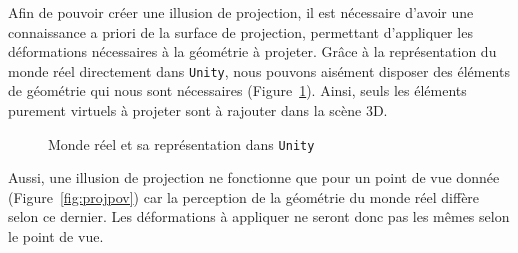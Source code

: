 Afin de pouvoir créer une illusion de projection, il est nécessaire d'avoir une connaissance a priori de la surface de projection, permettant d'appliquer les déformations nécessaires à la géométrie à projeter. Grâce à la représentation du monde réel directement dans \texttt{Unity}, nous pouvons aisément disposer des éléments de géométrie qui nous sont nécessaires (Figure~\ref{fig:realvsunity}). Ainsi, seuls les éléments purement virtuels à projeter sont à rajouter dans la scène 3D.

\begin{figure}[H]
\centering
\caption{Monde réel et sa représentation dans \texttt{Unity}}
\label{fig:realvsunity}
\end{figure}

Aussi, une illusion de projection ne fonctionne que pour un point de vue donnée (Figure~\ref{fig:projpov}) car la perception de la géométrie du monde réel diffère selon ce dernier. Les déformations à appliquer ne seront donc pas les mêmes selon le point de vue.

